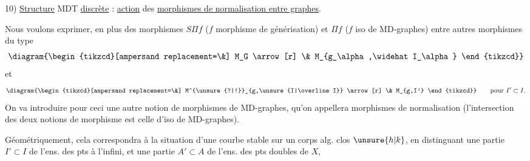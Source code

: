 10) \uline{Structure} MDT \uline{discrète} : \uline{action} des \uline{morphismes de normalisation entre graphes}.

Nous voulons exprimer, en plus des morphismes  $S\Pi f$ ($f$ morphisme de générisation) et $\Pi f$ ($f$ iso de MD-graphes) entre autres  morphismes du type
\[
\diagram{\begin{tikzcd}[ampersand replacement=\&]
M_G \arrow[r] \& M_{g_\alpha,\widehat I_\alpha}
\end{tikzcd}}
\]
et
\[
\diagram{\begin{tikzcd}[ampersand replacement=\&]
M^{\unsure{?|!}}_{g,\unsure{I|\overline I}} \arrow[r] \& M_{g,I'}
\end{tikzcd}}
\qquad\text{pour }I'\subset I.
\]
On va introduire pour ceci une autre notion de morphismes de MD-graphes, qu'on appellera morphismes de normalisation (l'intersection des deux notions de morphisme est celle d'iso de MD-graphes).

Géométriquement, cela correspondra à la situation d'une courbe stable  sur un corps alg. clos $\unsure{h|k}$, en distinguant une partie $I'\subset I$ de l'ens. des pts à l'infini, et une partie $A'\subset A$ de l'ens. des pts doubles de $X$,
